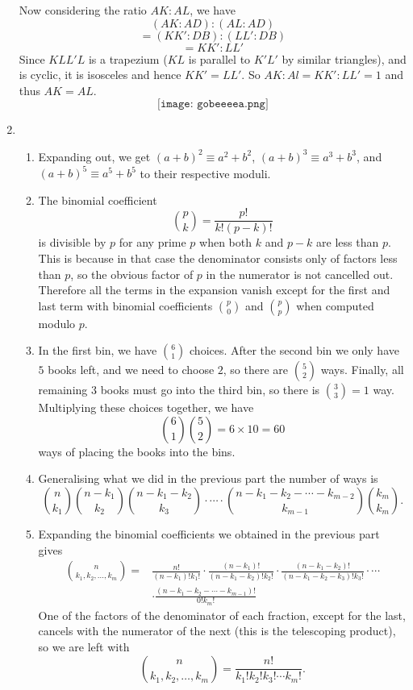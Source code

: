 \documentclass[a4paper]{article}
\begin{document}
\begin{enumerate}
  Now considering the ratio $AK:AL$, we have $$(AK:AD):(AL:AD)$$ $$=(KK':DB):(LL':DB)$$ $$=KK':LL'$$ Since $KLL'L$ is a trapezium ($KL$ is parallel to $K'L'$ by similar triangles), and is cyclic, it is isosceles and hence $KK'=LL'$. So $AK:Al = KK':LL' = 1$ and thus $AK = AL$. 
  \[{\texttt{[image: gobeeeea.png]}}\]
\item
  \begin{enumerate}
\item Expanding out, we get \((a+b)^2\equiv a^2+b^2\), \((a+b)^3\equiv a^3+b^3\), and \((a+b)^5\equiv a^5+b^5\) to their respective moduli.
\item The binomial coefficient \[\binom{p}{k}=\frac{p!}{k!(p-k)!}\] is divisible by \(p\) for any prime \(p\) when both \(k\) and \(p-k\) are
  less than \(p\). This is because in that case the denominator consists only of factors less than \(p\), so the obvious factor of \(p\) in
  the numerator is not cancelled out. Therefore all the terms in the expansion vanish except for the first and last term with binomial coefficients
  \(\binom{p}{0}\) and \(\binom{p}{p}\) when computed modulo \(p\).
\item In the first bin, we have \(\binom{6}{1}\) choices. After the second bin we only have \(5\) books left, and we need to choose \(2\), so
  there are \(\binom{5}{2}\) ways. Finally, all remaining \(3\) books must go into the third bin, so there is \(\binom{3}{3}=1\) way. Multiplying these
  choices together, we have \[\binom{6}{1}\binom{5}{2}=6\times10=60\] ways of placing the books into the bins.
\item Generalising what we did in the previous part the number of ways is
  \[\binom{n}{k_1}\binom{n-k_1}{k_2}\binom{n-k_1-k_2}{k_3}\cdot\cdots\cdot\binom{n-k_1-k_2-\cdots-k_{m-2}}{k_{m-1}}\binom{k_m}{k_m}.\]
\item Expanding the binomial coefficients we obtained in the previous part gives
  \[
    \begin{split}
      \binom{n}{k_1,k_2,\ldots,k_m}=&\frac{n!}{(n-k_1)!k_1!}\cdot\frac{(n-k_1)!}{(n-k_1-k_2)!k_2!}\cdot\frac{(n-k_1-k_2)!}{(n-k_1-k_2-k_3)!k_3!}\cdot\cdots\\&\cdot\frac{(n-k_1-k_2-\cdots-k_{m-1})!}{0!k_m!}
    \end{split}
  \]
  One of the factors of the denominator of each fraction, except for the last, cancels with the numerator of the next (this is the telescoping product), so we are left with
  \[
    \binom{n}{k_1,k_2,\ldots,k_m}=\frac{n!}{k_1!k_2!k_3!\cdots k_m!}.
\]
\end{enumerate}
\end{enumerate}
\end{document}
